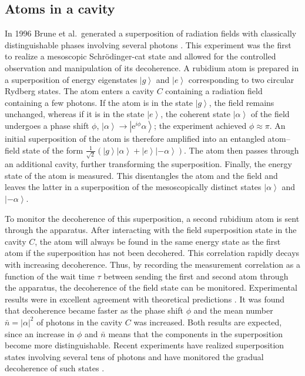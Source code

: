 \documentclass[aps,pra,reprint,amsmath,amssymb,showpacs,nofootinbib,floatfix,onecolumn,12pt]{revtex4-1}
\newcommand{\ket}[1]{\left\vert{#1}\right\rangle}
\providecommand{\abs}[1]{\left\lvert#1\right\rvert}
\newcommand{\E}{\text{e}}
\begin{document}
\subsection{\label{sec:atoms-cavity}Atoms in a cavity}

In 1996 Brune et al.\ generated a superposition of radiation fields with classically distinguishable phases involving several photons \cite{Brune:1996:om,Raimond:2001:aa,Kaiser:2001:tm}. This experiment was the first to realize a mesoscopic Schr\"odinger-cat state and allowed for the controlled observation and manipulation of its decoherence. A rubidium atom is prepared in a superposition of energy eigenstates $\ket{g}$ and $\ket{e}$ corresponding to two circular Rydberg states. The atom enters a cavity $C$ containing a radiation field containing a few photons. If the atom is in the state $\ket{g}$, the field remains unchanged, whereas if it is in the state  $\ket{e}$, the coherent state $\ket{\alpha}$ of the field undergoes a phase shift $\phi$, $\ket{\alpha} \longrightarrow \ket{\E^{i\phi} \alpha}$; the experiment achieved $\phi \approx \pi$. An initial superposition of the atom is therefore amplified into an entangled atom--field state of the form $\frac{1}{\sqrt{2}} \left( \ket{g} \ket{\alpha} + \ket{e} \ket{-\alpha} \right)$. The atom then passes through an additional cavity, further transforming the superposition. Finally, the energy state of the atom is measured. This disentangles the atom and the field and leaves the latter in a superposition of the mesoscopically distinct states $\ket{\alpha}$ and $\ket{-\alpha}$.

To monitor the decoherence of this superposition, a second rubidium atom is sent through the apparatus. After interacting with the field superposition state in the cavity $C$, the atom will always be found in the same energy state as the first atom if the superposition has not been decohered. This correlation rapidly decays with increasing decoherence. Thus, by recording the measurement correlation as a function of the wait time $\tau$ between sending the first and second atom through the apparatus, the decoherence of the field state can be monitored. Experimental results were in excellent agreement with theoretical predictions \cite{Davidovich:1996:sa,Maitre:1997:tv}. It was found that decoherence became faster as the phase shift $\phi$ and the mean number $\bar{n}=\abs{\alpha}^2$ of photons in the cavity $C$ was increased. Both results are expected, since an increase in $\phi$ and $\bar{n}$ means that the components in the superposition become more distinguishable. Recent experiments have realized superposition states involving several tens of photons \cite{Auffeves:2003:za} and have monitored the gradual decoherence of such states \cite{Deleglise:2008:oo}.
\end{document}
